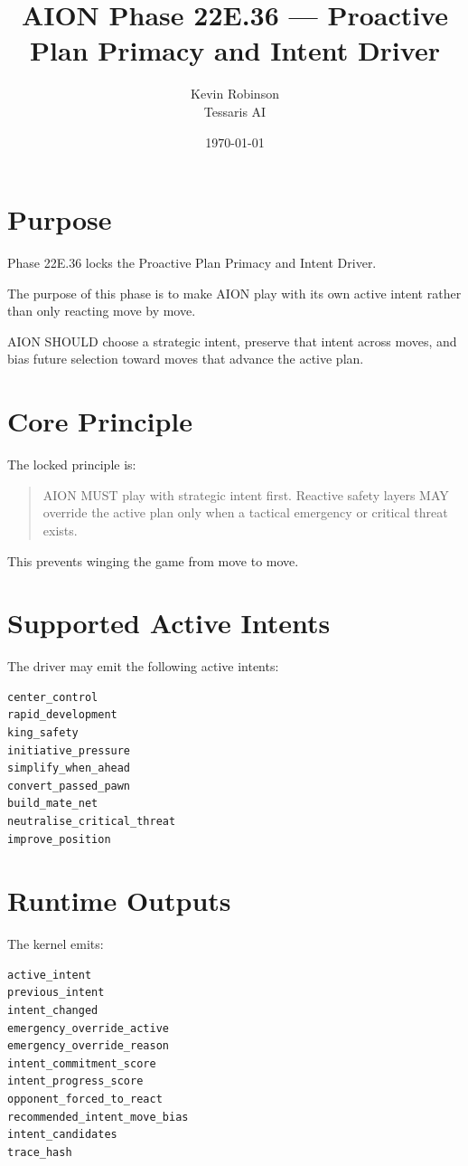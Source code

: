 \documentclass[11pt,a4paper]{article}
\title{\textbf{AION Phase 22E.36 --- Proactive Plan Primacy and Intent Driver}}
\author{Kevin Robinson\\Tessaris AI}
\date{\today}
\begin{document}
\maketitle

\section{Purpose}

Phase 22E.36 locks the Proactive Plan Primacy and Intent Driver.

The purpose of this phase is to make AION play with its own active intent rather than only reacting move by move.

AION SHOULD choose a strategic intent, preserve that intent across moves, and bias future selection toward moves that advance the active plan.

\section{Core Principle}

The locked principle is:

\begin{quote}
AION MUST play with strategic intent first. Reactive safety layers MAY override the active plan only when a tactical emergency or critical threat exists.
\end{quote}

This prevents winging the game from move to move.

\section{Supported Active Intents}

The driver may emit the following active intents:

\begin{verbatim}
center_control
rapid_development
king_safety
initiative_pressure
simplify_when_ahead
convert_passed_pawn
build_mate_net
neutralise_critical_threat
improve_position
\end{verbatim}

\section{Runtime Outputs}

The kernel emits:

\begin{verbatim}
active_intent
previous_intent
intent_changed
emergency_override_active
emergency_override_reason
intent_commitment_score
intent_progress_score
opponent_forced_to_react
recommended_intent_move_bias
intent_candidates
trace_hash
\end{verbatim}
\end{document}
